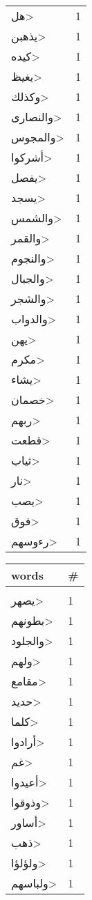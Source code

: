 \documentclass{article}
\begin{document}
\begin{multicols}{6}
\begin{center}
\begin{tabular}{ P{2cm}  P{1cm}}
\<هل> & 1 \\ 
\<يذهبن> & 1 \\ 
\<كيده> & 1 \\ 
\<يغيظ> & 1 \\ 
\<وكذلك> & 1 \\ 
\<والنصارى> & 1 \\ 
\<والمجوس> & 1 \\ 
\<أشركوا> & 1 \\ 
\<يفصل> & 1 \\ 
\<يسجد> & 1 \\ 
\<والشمس> & 1 \\ 
\<والقمر> & 1 \\ 
\<والنجوم> & 1 \\ 
\<والجبال> & 1 \\ 
\<والشجر> & 1 \\ 
\<والدواب> & 1 \\ 
\<يهن> & 1 \\ 
\<مكرم> & 1 \\ 
\<يشاء> & 1 \\ 
\<خصمان> & 1 \\ 
\<ربهم> & 1 \\ 
\<قطعت> & 1 \\ 
\<ثياب> & 1 \\ 
\<نار> & 1 \\ 
\<يصب> & 1 \\ 
\<فوق> & 1 \\ 
\<رءوسهم> & 1 \\ 
\end{tabular} 
\begin{tabular}{ P{2cm}  P{1cm}} 
\textbf{words}    & \textbf{\#}  \\
\hline
\\[0.01cm]
\<يصهر> & 1 \\ 
\<بطونهم> & 1 \\ 
\<والجلود> & 1 \\ 
\<ولهم> & 1 \\ 
\<مقامع> & 1 \\ 
\<حديد> & 1 \\ 
\<كلما> & 1 \\ 
\<أرادوا> & 1 \\ 
\<غم> & 1 \\ 
\<أعيدوا> & 1 \\ 
\<وذوقوا> & 1 \\ 
\<أساور> & 1 \\ 
\<ذهب> & 1 \\ 
\<ولؤلؤا> & 1 \\ 
\<ولباسهم> & 1 \\ 

\end{tabular}
\end{center}
\end{multicols}
\end{document}
